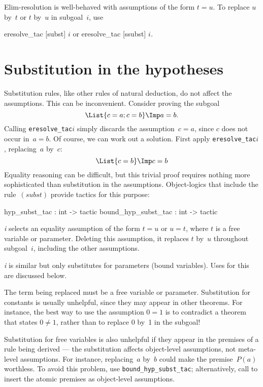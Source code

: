 Elim-resolution is well-behaved with assumptions of the form $t=u$.
To replace $u$ by~$t$ or $t$ by~$u$ in subgoal~$i$, use
\begin{ttbox} 
eresolve_tac [subst] \(i\)    {\rm or}    eresolve_tac [ssubst] \(i\){\it.}
\end{ttbox}


\section{Substitution in the hypotheses}
Substitution rules, like other rules of natural deduction, do not affect
the assumptions.  This can be inconvenient.  Consider proving the subgoal
\[ \List{c=a; c=b} \Imp a=b. \]
Calling {\tt eresolve_tac\ts[ssubst]\ts\(i\)} simply discards the
assumption~$c=a$, since $c$ does not occur in~$a=b$.  Of course, we can
work out a solution.  First apply {\tt eresolve_tac\ts[subst]\ts\(i\)},
replacing~$a$ by~$c$:
\[ \List{c=b} \Imp c=b \]
Equality reasoning can be difficult, but this trivial proof requires
nothing more sophisticated than substitution in the assumptions.
Object-logics that include the rule~$(subst)$ provide tactics for this
purpose:
\begin{ttbox} 
hyp_subst_tac       : int -> tactic
bound_hyp_subst_tac : int -> tactic
\end{ttbox}
\begin{ttdescription}
\item[\ttindexbold{hyp_subst_tac} {\it i}] 
  selects an equality assumption of the form $t=u$ or $u=t$, where $t$ is a
  free variable or parameter.  Deleting this assumption, it replaces $t$
  by~$u$ throughout subgoal~$i$, including the other assumptions.

\item[\ttindexbold{bound_hyp_subst_tac} {\it i}] 
  is similar but only substitutes for parameters (bound variables).
  Uses for this are discussed below.
\end{ttdescription}
The term being replaced must be a free variable or parameter.  Substitution
for constants is usually unhelpful, since they may appear in other
theorems.  For instance, the best way to use the assumption $0=1$ is to
contradict a theorem that states $0\not=1$, rather than to replace 0 by~1
in the subgoal!

Substitution for free variables is also unhelpful if they appear in the
premises of a rule being derived --- the substitution affects object-level
assumptions, not meta-level assumptions.  For instance, replacing~$a$
by~$b$ could make the premise~$P(a)$ worthless.  To avoid this problem, use
{\tt bound_hyp_subst_tac}; alternatively, call  to
insert the atomic premises as object-level assumptions.


